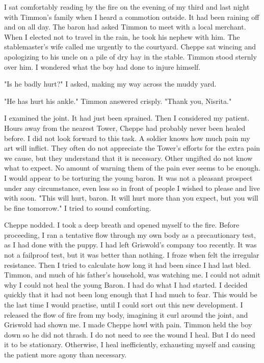 \documentclass{article}
\begin{document}
I sat comfortably reading by the fire on the evening of my third and last night with Timmon's family when I heard a commotion outside. It had been raining off and on all day. The baron had asked Timmon to meet with a local merchant. When I elected not to travel in the rain, he took his nephew with him. The stablemaster's wife called me urgently to the courtyard. Cheppe sat wincing and apologizing to his uncle on a pile of dry hay in the stable. Timmon stood sternly over him. I wondered what the boy had done to injure himself.

"Is he badly hurt?" I asked, making my way across the muddy yard.

"He has hurt his ankle." Timmon answered crisply. "Thank you, Nisrita."

I examined the joint. It had just been sprained. Then I considered my patient. Hours away from the nearest Tower, Cheppe had probably never been healed before. I did not look forward to this task. A soldier knows how much pain my art will inflict. They often do not appreciate the Tower's efforts for the extra pain we cause, but they understand that it is necessary. Other ungifted do not know what to expect. No amount of warning them of the pain ever seems to be enough. I would appear to be torturing the young baron. It was not a pleasant prospect under any circumstance, even less so in front of people I wished to please and live with soon. "This will hurt, baron. It will hurt more than you expect, but you will be fine tomorrow." I tried to sound comforting.

Cheppe nodded. I took a deep breath and opened myself to the fire. Before proceeding, I ran a tentative flow through my own body as a precautionary test, as I had done with the puppy. I had left Griswold's company too recently. It was not a failproof test, but it was better than nothing. I froze when felt the irregular resistance. Then I tried to calculate how long it had been since I had last bled. Timmon, and much of his father's household, was watching me. I could not admit why I could not heal the young Baron. I had do what I had started. I decided quickly that it had not been long enough that I had much to fear. This would be the last time I would practise, until I could sort out this new development. I released the flow of fire from my body, imagining it curl around the joint, and Griswold had shown me. I made Cheppe howl with pain. Timmon held the boy down so he did not thrash. I do not need to see the wound I heal. But I do need it to be stationary. Otherwise, I heal inefficiently, exhausting myself and causing the patient more agony than necessary.
\end{document}
